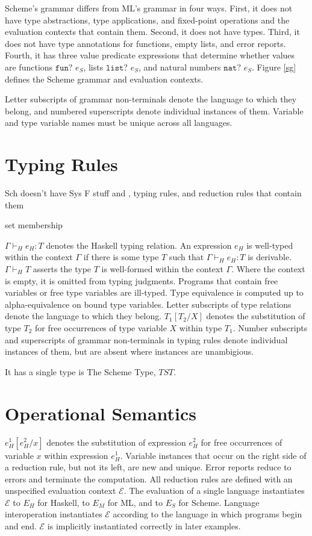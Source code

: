 Scheme's grammar differs from ML's grammar in four ways.  First, it does not have type abstractions, type applications, and fixed-point operations and the evaluation contexts that contain them.  Second, it does not have types.  Third, it does not have type annotations for functions, empty lists, and error reports.  Fourth, it has three value predicate expressions that determine whether values are functions $\mathtt{fun?}$ $e_{S}$, lists $\mathtt{list?}$ $e_{S}$, and natural numbers $\mathtt{nat?}$ $e_{S}$.  Figure \ref{sg} defines the Scheme grammar and evaluation contexts.

Letter subscripts of grammar non-terminals denote the language to which they belong, and numbered superscripts denote individual instances of them.  Variable and type variable names must be unique across all languages.

\section{Typing Rules}

Sch doesn't have Sys F stuff and , typing rules, and reduction rules that contain them

set membership

$\Gamma\vdash_{H}e_{H}:T$ denotes the Haskell typing relation.  An expression $e_{H}$ is well-typed within the context $\Gamma$ if there is some type $T$ such that $\Gamma\vdash_{H}e_{H}:T$ is derivable.  $\Gamma\vdash_{H}T$ asserts the type $T$ is well-formed within the context $\Gamma$.  Where the context is empty, it is omitted from typing judgments.  Programs that contain free variables or free type variables are ill-typed.  Type equivalence is computed up to alpha-equivalence on bound type variables.  Letter subscripts of type relations denote the language to which they belong.  $T_{1}[T_{2}/X]$ denotes the substitution of type $T_{2}$ for free occurrences of type variable $X$ within type $T_{1}$.  Number subscripts and superscripts of grammar non-terminals in typing rules denote individual instances of them, but are absent where instances are unambigious.

It has a single type is The Scheme Type, $TST$.  

\section{Operational Semantics}

$e_{H}^{1}[e_{H}^{2}/x]$ denotes the substitution of expression $e_{H}^{2}$ for free occurrences of variable $x$ within expression $e_{H}^{1}$.  Variable instances that occur on the right side of a reduction rule, but not its left, are new and unique.  Error reports reduce to errors and terminate the computation.  All reduction rules are defined with an unspecified evaluation context $\mathscr{E}$.  The evaluation of a single language instantiates $\mathscr{E}$ to $E_{H}$ for Haskell, to $E_{M}$ for ML, and to $E_{S}$ for Scheme.  Language interoperation instantiates $\mathscr{E}$ according to the language in which programs begin and end.  $\mathscr{E}$ is implicitly instantiated correctly in later examples.

